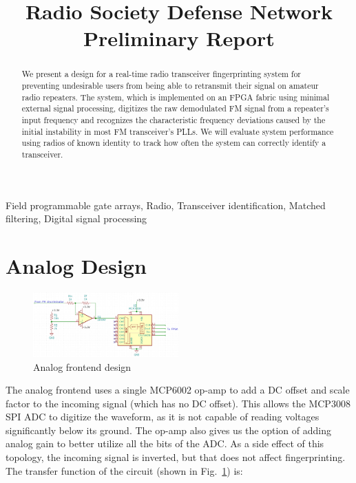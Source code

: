\documentclass[conference]{IEEEtran}
\begin{document}
\title{Radio Society Defense Network Preliminary Report}

\author{
}

\maketitle

\begin{abstract}
We present a design for a real-time radio transceiver fingerprinting system for preventing undesirable users from being able to retransmit their signal on amateur radio repeaters. The system, which is implemented on an FPGA fabric using minimal external signal processing, digitizes the raw demodulated FM signal from a repeater's input frequency and recognizes the characteristic frequency deviations caused by the initial instability in most FM transceiver's PLLs. We will evaluate system performance using radios of known identity to track how often the system can correctly identify a transceiver.
\end{abstract}

\begin{IEEEkeywords}
Field programmable gate arrays, Radio, Transceiver identification, Matched filtering, Digital signal processing
\end{IEEEkeywords}

\section{Analog Design}

\begin{figure}
    \centerline{\includegraphics[width=0.5\textwidth]{Analog_Design.png}}
    \caption{Analog frontend design}
    \label{analog_frontend_design}
\end{figure}

The analog frontend uses a single MCP6002 op-amp to add a DC offset and scale factor to the incoming signal (which has no DC offset). This allows the MCP3008 SPI ADC to digitize the waveform, as it is not capable of reading voltages significantly below its ground. The op-amp also gives us the option of adding analog gain to better utilize all the bits of the ADC. As a side effect of this topology, the incoming signal is inverted, but that does not affect fingerprinting. The transfer function of the circuit (shown in Fig.~\ref{analog_frontend_design}) is:
\end{document}
